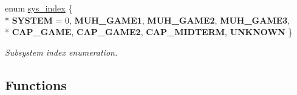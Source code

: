 \begin{DoxyCompactItemize}
enum \hyperlink{group__subsys_gadc5d9f07ddb402114afea1177fc9301b}{sys\+\_\+index} \{ \\*
{\bfseries S\+Y\+S\+T\+E\+M} = 0, 
{\bfseries M\+U\+H\+\_\+\+G\+A\+M\+E1}, 
{\bfseries M\+U\+H\+\_\+\+G\+A\+M\+E2}, 
{\bfseries M\+U\+H\+\_\+\+G\+A\+M\+E3}, 
\\*
{\bfseries C\+A\+P\+\_\+\+G\+A\+M\+E}, 
{\bfseries C\+A\+P\+\_\+\+G\+A\+M\+E2}, 
{\bfseries C\+A\+P\+\_\+\+M\+I\+D\+T\+E\+R\+M}, 
{\bfseries U\+N\+K\+N\+O\+W\+N}
 \}
\begin{DoxyCompactList}\small\item\em Subsystem index enumeration. \end{DoxyCompactList}\end{DoxyCompactItemize}
\subsection*{Functions}
